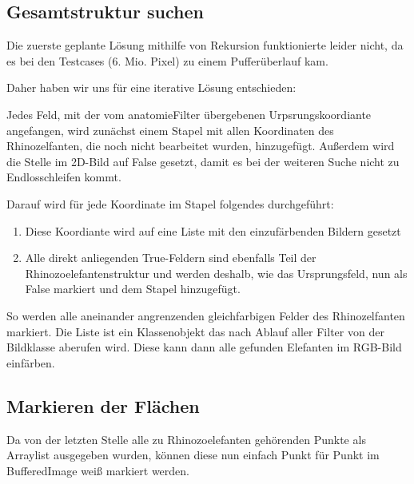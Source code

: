 	\subsection {Gesamtstruktur suchen}
	Die zuerste geplante Lösung mithilfe von Rekursion funktionierte leider nicht, da es bei den Testcases (6. Mio. Pixel) zu einem Pufferüberlauf kam.

	Daher haben wir uns für eine iterative Lösung entschieden:

	Jedes Feld, mit der vom anatomieFilter übergebenen Urpsrungskoordiante angefangen, wird zunächst einem Stapel mit allen Koordinaten des Rhinozelfanten, die noch nicht bearbeitet wurden, hinzugefügt. Außerdem wird die Stelle im 2D-Bild auf False gesetzt, damit es bei der weiteren Suche nicht zu Endlosschleifen kommt.

	Darauf wird für jede Koordinate im Stapel folgendes durchgeführt:

	\begin{enumerate}
		\item Diese Koordiante wird auf eine Liste mit den einzufärbenden Bildern gesetzt
		\item Alle direkt anliegenden True-Feldern sind ebenfalls Teil der Rhinozoelefantenstruktur und werden deshalb, wie das Ursprungsfeld, nun als False markiert und dem Stapel hinzugefügt.
	\end{enumerate}

	So werden alle aneinander angrenzenden gleichfarbigen Felder des Rhinozelfanten markiert. Die Liste ist ein Klassenobjekt das nach Ablauf aller Filter von der Bildklasse aberufen wird. Diese kann dann alle gefunden Elefanten im RGB-Bild einfärben.

	\subsection {Markieren der Flächen}

	Da von der letzten Stelle alle zu Rhinozoelefanten gehörenden Punkte als Arraylist ausgegeben wurden, können diese nun einfach Punkt für Punkt im BufferedImage weiß markiert werden.